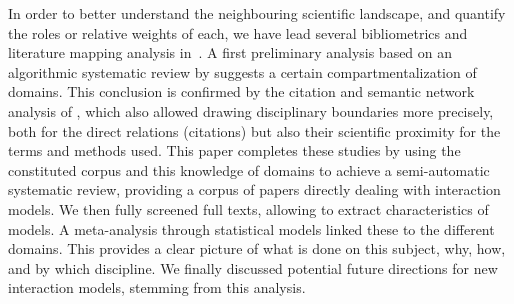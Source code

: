 \documentclass[10pt]{article}
\begin{document}
In order to better understand the neighbouring scientific landscape, and quantify the roles or relative weights of each, we have lead several bibliometrics and literature mapping analysis in~\cite{raimbault2018caracterisation}. A first preliminary analysis based on an algorithmic systematic review by \cite{raimbault2017models} suggests a certain compartmentalization of domains. This conclusion is confirmed by the citation and semantic network analysis of \cite{raimbault2018caracterisation}, which also allowed drawing disciplinary boundaries more precisely, both for the direct relations (citations) but also their scientific proximity for the terms and methods used. This paper completes these studies by using the constituted corpus and this knowledge of domains to achieve a semi-automatic systematic review, providing a corpus of papers directly dealing with interaction models. We then fully screened full texts, allowing to extract characteristics of models. A meta-analysis through statistical models linked these to the different domains. This provides a clear picture of what is done on this subject, why, how, and by which discipline. We finally discussed potential future directions for new interaction models, stemming from this analysis.











%

%
% 
\end{document}
